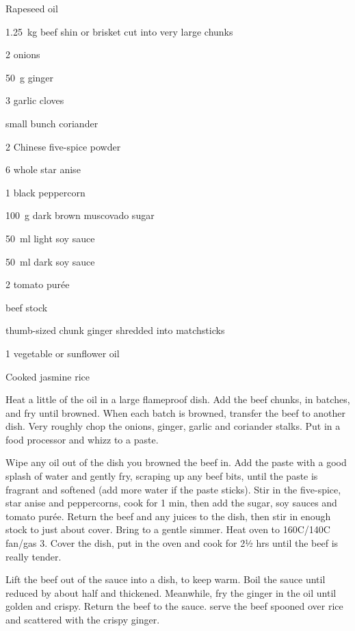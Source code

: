 \label{recipe:gingered_beef}

\begin{ingredients}

  \item Rapeseed oil 
  \item \qty{1.25}{\kilo \gram} beef shin or brisket cut into very large chunks 
  \item 2 onions 
  \item \SI{50}{\gram} ginger 
  \item 3 garlic cloves 
  \item small bunch coriander 
  \item \SI{2}{\teaspoon} Chinese five-spice powder 
  \item 6 whole star anise 
  \item \SI{1}{\teaspoon} black peppercorn 
  \item \SI{100}{\gram} dark brown muscovado sugar 
  \item \SI{50}{\milli \litre} light soy sauce 
  \item \SI{50}{\milli \litre} dark soy sauce 
  \item \SI{2}{\tablespoon} tomato purée 
  \item beef stock 
  \item thumb-sized chunk ginger shredded into matchsticks 
  \item \SI{1}{\tablespoon} vegetable or sunflower oil 
  \item Cooked jasmine rice
\end{ingredients}


\begin{method}
  	Heat a little of the oil in a large flameproof dish. Add the beef
chunks, in batches, and fry until browned. When each batch is
browned, transfer the beef to another dish. Very roughly chop the
onions, ginger, garlic and coriander stalks. Put in a food processor
and whizz to a paste. 

Wipe any oil out of the dish you browned the beef in. Add the paste
with a good splash of water and gently fry, scraping up any beef bits,
until the paste is fragrant and softened (add more water if the paste
sticks). Stir in the five-spice, star anise and peppercorns, cook for 1
min, then add the sugar, soy sauces and tomato purée. Return the beef
and any juices to the dish, then stir in enough stock to just about
cover. Bring to a gentle simmer. Heat oven to 160C/140C fan/gas 3.
Cover the dish, put in the oven and cook for 2½ hrs until the beef is
really tender.

Lift the beef out of the sauce into a dish, to keep warm. Boil the
sauce until reduced by about half and thickened. Meanwhile, fry the
ginger in the oil until golden and crispy. Return the beef to the sauce.
serve the beef spooned over rice and scattered with the crispy ginger.
  
\end{method}




